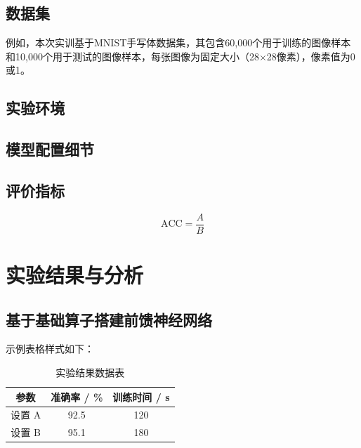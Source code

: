 \documentclass{style/course-report}
\begin{document}
\subsection{数据集}

例如，本次实训基于MNIST手写体数据集\cite{lecun2002gradient}，其包含60,000个用于训练的图像样本和10,000个用于测试的图像样本，每张图像为固定大小（28$\times$28像素），像素值为0或1。


\subsection{实验环境}


\subsection{模型配置细节}

\subsection{评价指标}

\begin{equation}
    \mathrm{ACC} = \frac{A}{B}
    \label{eq:acc}
\end{equation}


\section{实验结果与分析}

\subsection{基于基础算子搭建前馈神经网络}

示例表格样式如下：
\begin{table}[H]
    \centering
    \caption{实验结果数据表} %
    \begin{tabular}{ccc}
        \toprule
        参数 & 准确率 / \% & 训练时间 / s \\ %
        \midrule
        设置 A & 92.5 & 120 \\
        设置 B & 95.1 & 180 \\
        \bottomrule
    \end{tabular}
    \label{tab:example}
\end{table} %
\end{document}
